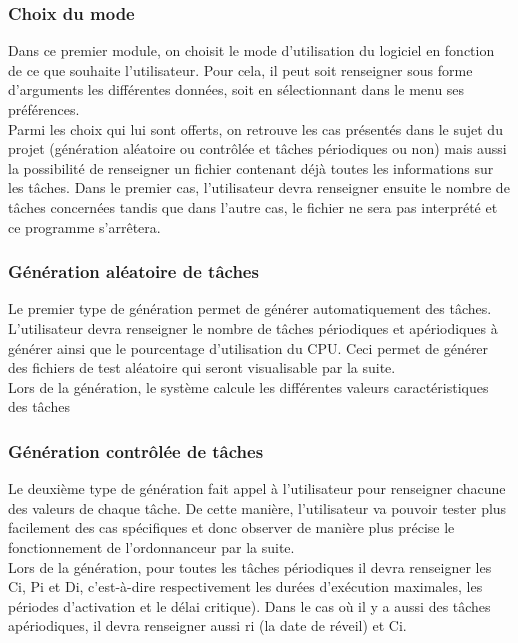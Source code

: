 			\subsubsection{Choix du mode}
				Dans ce premier module, on choisit le mode d’utilisation du logiciel en fonction de ce que souhaite l’utilisateur. Pour cela, il peut soit renseigner sous forme d’arguments les différentes données, soit en sélectionnant dans le menu ses préférences. \\

				Parmi les choix qui lui sont offerts, on retrouve les cas présentés dans le sujet du projet (génération aléatoire ou contrôlée et tâches périodiques ou non) mais aussi la possibilité de renseigner un fichier contenant déjà toutes les informations sur les tâches. Dans le premier cas, l’utilisateur devra renseigner ensuite le nombre de tâches concernées tandis que dans l’autre cas, le fichier ne sera pas interprété et ce programme s’arrêtera.


			\subsubsection{Génération aléatoire de tâches}
				Le premier type de génération permet de générer automatiquement des tâches. L'utilisateur devra renseigner le nombre de tâches périodiques et apériodiques à générer ainsi que le pourcentage d'utilisation du CPU. Ceci permet de générer des fichiers de test aléatoire qui seront visualisable par la suite.\\
				Lors de la génération, le système calcule les différentes valeurs caractéristiques des tâches 

			\subsubsection{Génération contrôlée de tâches}
				Le deuxième type de génération fait appel à l'utilisateur pour renseigner chacune des valeurs de chaque tâche. De cette manière, l'utilisateur va pouvoir tester plus facilement des cas spécifiques et donc observer de manière plus précise le fonctionnement de l'ordonnanceur par la suite. \\
				Lors de la génération, pour toutes les tâches périodiques il devra renseigner les Ci, Pi et Di, c'est-à-dire respectivement les durées d'exécution maximales, les périodes d'activation et le délai critique). Dans le cas où il y a aussi des tâches apériodiques, il devra renseigner aussi ri (la date de réveil) et Ci.

